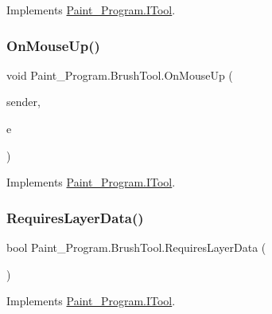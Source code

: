 Implements \mbox{\hyperlink{interface_paint___program_1_1_i_tool_a6a1cbe840b5cfc8a9b9463cc21590845}{Paint\+\_\+\+Program.\+I\+Tool}}.

\mbox{\label{class_paint___program_1_1_brush_tool_a20c7beba691866bed3cea6a63400d005}} 
\subsubsection{\texorpdfstring{On\+Mouse\+Up()}{OnMouseUp()}}
{\footnotesize\ttfamily void Paint\+\_\+\+Program.\+Brush\+Tool.\+On\+Mouse\+Up (\begin{DoxyParamCaption}\item[{object}]{sender,  }\item[{Mouse\+Event\+Args}]{e }\end{DoxyParamCaption})\hspace{0.3cm}{\ttfamily [inline]}}



Implements \mbox{\hyperlink{interface_paint___program_1_1_i_tool_a47984c2879213022f1684c07f7bba73e}{Paint\+\_\+\+Program.\+I\+Tool}}.

\mbox{\label{class_paint___program_1_1_brush_tool_ae96d027fe5ef110b5b00802a2d842a15}} 
\subsubsection{\texorpdfstring{Requires\+Layer\+Data()}{RequiresLayerData()}}
{\footnotesize\ttfamily bool Paint\+\_\+\+Program.\+Brush\+Tool.\+Requires\+Layer\+Data (\begin{DoxyParamCaption}{ }\end{DoxyParamCaption})\hspace{0.3cm}{\ttfamily [inline]}}



Implements \mbox{\hyperlink{interface_paint___program_1_1_i_tool_a6d45b6c48da8130ae41db3a66cdaef9a}{Paint\+\_\+\+Program.\+I\+Tool}}.

